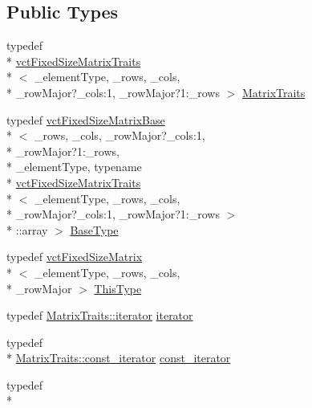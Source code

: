 \subsection*{Public Types}
\begin{DoxyCompactItemize}
\item 
typedef \\*
\hyperlink{classvct_fixed_size_matrix_traits}{vct\-Fixed\-Size\-Matrix\-Traits}\\*
$<$ \-\_\-element\-Type, \-\_\-rows, \-\_\-cols, \\*
\-\_\-row\-Major?\-\_\-cols\-:1, \-\_\-row\-Major?1\-:\-\_\-rows $>$ \hyperlink{classvct_fixed_size_matrix_a29b71912a8827d4baca637aebfe41eca}{Matrix\-Traits}
\item 
typedef \hyperlink{classvct_fixed_size_matrix_base}{vct\-Fixed\-Size\-Matrix\-Base}\\*
$<$ \-\_\-rows, \-\_\-cols, \-\_\-row\-Major?\-\_\-cols\-:1, \\*
\-\_\-row\-Major?1\-:\-\_\-rows, \\*
\-\_\-element\-Type, typename \\*
\hyperlink{classvct_fixed_size_matrix_traits}{vct\-Fixed\-Size\-Matrix\-Traits}\\*
$<$ \-\_\-element\-Type, \-\_\-rows, \-\_\-cols, \\*
\-\_\-row\-Major?\-\_\-cols\-:1, \-\_\-row\-Major?1\-:\-\_\-rows $>$\\*
\-::array $>$ \hyperlink{classvct_fixed_size_matrix_a9d96b338cbb52283cdb817b6b497feb5}{Base\-Type}
\item 
typedef \hyperlink{classvct_fixed_size_matrix}{vct\-Fixed\-Size\-Matrix}\\*
$<$ \-\_\-element\-Type, \-\_\-rows, \-\_\-cols, \\*
\-\_\-row\-Major $>$ \hyperlink{classvct_fixed_size_matrix_a45edd9a8b579712a59b766f04e1acfec}{This\-Type}
\item 
typedef \hyperlink{classvct_fixed_size_matrix_traits_a677065481ada218e2559cdec92e97fd8}{Matrix\-Traits\-::iterator} \hyperlink{classvct_fixed_size_matrix_a3512c7acacb6065a802898949cb78f43}{iterator}
\item 
typedef \\*
\hyperlink{classvct_fixed_size_matrix_traits_a8f7178fb03f45772c705fba16e08065d}{Matrix\-Traits\-::const\-\_\-iterator} \hyperlink{classvct_fixed_size_matrix_a6f5d0f13f38c1ccc8f736e6d0d5c8fb3}{const\-\_\-iterator}
\item 
typedef \\*

\end{DoxyCompactItemize}
